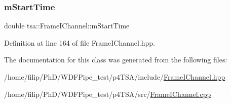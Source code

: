 \subsubsection{\texorpdfstring{m\+Start\+Time}{mStartTime}}
{\footnotesize\ttfamily double tsa\+::\+Frame\+I\+Channel\+::m\+Start\+Time\hspace{0.3cm}{\ttfamily [private]}}



Definition at line 164 of file Frame\+I\+Channel.\+hpp.



The documentation for this class was generated from the following files\+:\begin{DoxyCompactItemize}
\item 
/home/filip/\+Ph\+D/\+W\+D\+F\+Pipe\+\_\+test/p4\+T\+S\+A/include/\hyperlink{_frame_i_channel_8hpp}{Frame\+I\+Channel.\+hpp}\item 
/home/filip/\+Ph\+D/\+W\+D\+F\+Pipe\+\_\+test/p4\+T\+S\+A/src/\hyperlink{_frame_i_channel_8cpp}{Frame\+I\+Channel.\+cpp}\end{DoxyCompactItemize}

